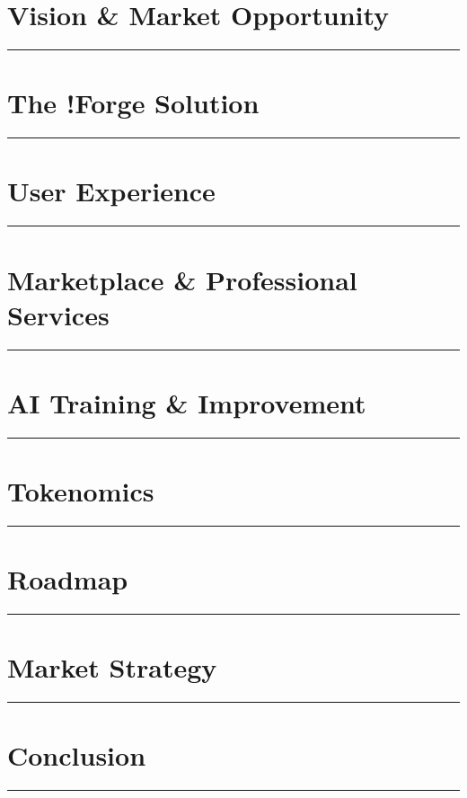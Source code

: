 \documentclass[11pt,a4paper]{article}
\newcommand{\fabSectionrule}{
    \vspace{-1ex}
    \noindent\textcolor{fabPrimary}{\rule{\linewidth}{2pt}}
    \vspace{1ex}
}
\begin{document}
\clearpage
\section{Vision \& Market Opportunity}
\fabSectionrule


\clearpage
\section{The !Forge Solution}
\fabSectionrule


\clearpage
\section{User Experience}
\fabSectionrule


\clearpage
\section{Marketplace \& Professional Services}
\fabSectionrule


\clearpage
\section{AI Training \& Improvement}
\fabSectionrule


\clearpage
\section{Tokenomics}
\fabSectionrule


\clearpage
\section{Roadmap}
\fabSectionrule


\clearpage
\section{Market Strategy}
\fabSectionrule


\clearpage
\section{Conclusion}
\fabSectionrule

\end{document}
